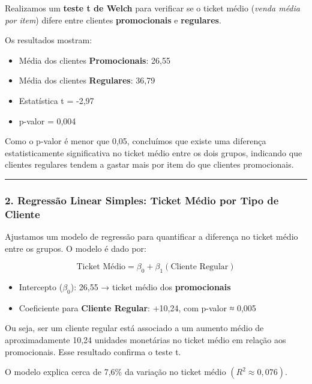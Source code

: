 \documentclass[
]{article}
\providecommand{\tightlist}{%
  \setlength{\itemsep}{0pt}\setlength{\parskip}{0pt}}
\begin{document}
Realizamos um \textbf{teste t de Welch} para verificar se o ticket médio
(\emph{venda média por item}) difere entre clientes
\textbf{promocionais} e \textbf{regulares}.

Os resultados mostram:

\begin{itemize}
\tightlist
\item
  Média dos clientes \textbf{Promocionais}: 26,55
\item
  Média dos clientes \textbf{Regulares}: 36,79
\item
  Estatística t = -2,97\\
\item
  p-valor = 0,004
\end{itemize}

Como o p-valor é menor que 0,05, concluímos que existe uma diferença
estatisticamente significativa no ticket médio entre os dois grupos,
indicando que clientes regulares tendem a gastar mais por item do que
clientes promocionais.

\begin{center}\rule{0.5\linewidth}{0.5pt}\end{center}

\subsubsection{2. Regressão Linear Simples: Ticket Médio por Tipo de
Cliente}\label{regressuxe3o-linear-simples-ticket-muxe9dio-por-tipo-de-cliente}

Ajustamos um modelo de regressão para quantificar a diferença no ticket
médio entre os grupos. O modelo é dado por:

\[
\text{Ticket Médio} = \beta_0 + \beta_1 (\text{Cliente Regular})
\]

\begin{itemize}
\tightlist
\item
  Intercepto (\(\beta_0\)): 26,55 → ticket médio dos
  \textbf{promocionais}
\item
  Coeficiente para \textbf{Cliente Regular}: +10,24, com p-valor ≈ 0,005
\end{itemize}

Ou seja, ser um cliente regular está associado a um aumento médio de
aproximadamente 10,24 unidades monetárias no ticket médio em relação aos
promocionais. Esse resultado confirma o teste t.

O modelo explica cerca de 7,6\% da variação no ticket médio
\((R^2 ≈ 0,076)\).
\end{document}
